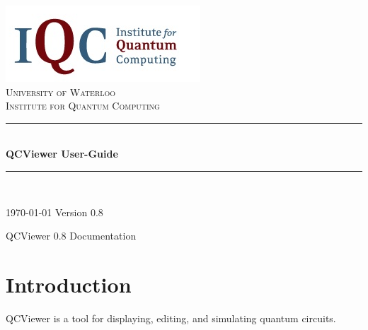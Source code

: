 \documentclass[10pt]{article}
\theoremstyle{definition}
\newcommand{\HRule}{\rule{\linewidth}{0.5mm}}
\begin{document}
\begin{titlepage}

\begin{center}


\includegraphics{Figures/Logo.png}\\[1cm]    

\textsc{\LARGE University of Waterloo}\\[1.5cm]

\textsc{\Large Institute for Quantum Computing}\\[0.5cm]


\HRule \\[0.4cm]
{ \huge \bfseries QCViewer User-Guide}\\[0.4cm]

\HRule \\[1.5cm]

\vfill

{\large \today}
{\large Version 0.8}

\end{center}

\end{titlepage}

\tableofcontents
\newpage

    \begin{flushright}
    QCViewer 0.8 Documentation
    \end{flushright}

\section{Introduction} \label{sec:Introduction}

QCViewer is a tool for displaying, editing, and simulating quantum circuits. 
\end{document}
